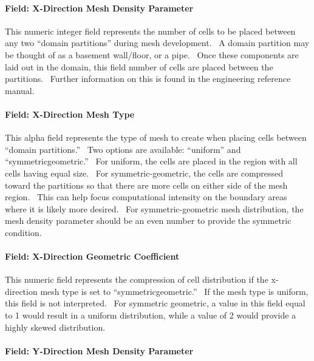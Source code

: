 \paragraph{Field: X-Direction Mesh Density Parameter}\label{field-x-direction-mesh-density-parameter}

This numeric integer field represents the number of cells to be placed between any two ``domain partitions'' during mesh development.~ A domain partition may be thought of as a basement wall/floor, or a pipe.~ Once these components are laid out in the domain, this field number of cells are placed between the partitions.~ Further information on this is found in the engineering reference manual.

\paragraph{Field: X-Direction Mesh Type}\label{field-x-direction-mesh-type}

This alpha field represents the type of mesh to create when placing cells between ``domain partitions.''~ Two options are available: ``uniform'' and ``symmetricgeometric.''~ For uniform, the cells are placed in the region with all cells having equal size.~ For symmetric-geometric, the cells are compressed toward the partitions so that there are more cells on either side of the mesh region.~ This can help focus computational intensity on the boundary areas where it is likely more desired.~ For symmetric-geometric mesh distribution, the mesh density parameter should be an even number to provide the symmetric condition.

\paragraph{Field: X-Direction Geometric Coefficient}\label{field-x-direction-geometric-coefficient}

This numeric field represents the compression of cell distribution if the x-direction mesh type is set to ``symmetricgeometric.''~ If the mesh type is uniform, this field is not interpreted.~ For symmetric geometric, a value in this field equal to 1 would result in a uniform distribution, while a value of 2 would provide a highly skewed distribution.

\paragraph{Field: Y-Direction Mesh Density Parameter}\label{field-y-direction-mesh-density-parameter}

